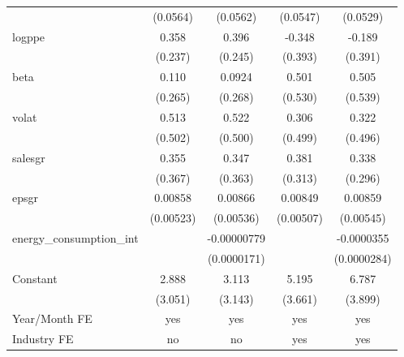 \begin{table}[htbp]
\begin{tabular}{l*{4}{c}}
                    &    (0.0564)         &    (0.0562)         &    (0.0547)         &    (0.0529)         \\
[1em]
logppe              &       0.358         &       0.396         &      -0.348         &      -0.189         \\
                    &     (0.237)         &     (0.245)         &     (0.393)         &     (0.391)         \\
[1em]
beta                &       0.110         &      0.0924         &       0.501         &       0.505         \\
                    &     (0.265)         &     (0.268)         &     (0.530)         &     (0.539)         \\
[1em]
volat               &       0.513         &       0.522         &       0.306         &       0.322         \\
                    &     (0.502)         &     (0.500)         &     (0.499)         &     (0.496)         \\
[1em]
salesgr             &       0.355         &       0.347         &       0.381         &       0.338         \\
                    &     (0.367)         &     (0.363)         &     (0.313)         &     (0.296)         \\
[1em]
epsgr               &     0.00858         &     0.00866         &     0.00849\sym{*}  &     0.00859         \\
                    &   (0.00523)         &   (0.00536)         &   (0.00507)         &   (0.00545)         \\
[1em]
energy\_consumption\_int&                     & -0.00000779         &                     &  -0.0000355         \\
                    &                     & (0.0000171)         &                     & (0.0000284)         \\
[1em]
Constant            &       2.888         &       3.113         &       5.195         &       6.787\sym{*}  \\
                    &     (3.051)         &     (3.143)         &     (3.661)         &     (3.899)         \\
\hline
Year/Month FE       &         yes         &         yes         &         yes         &         yes         \\
Industry FE         &          no         &          no         &         yes         &         yes         \\

\end{tabular}
\end{table}

